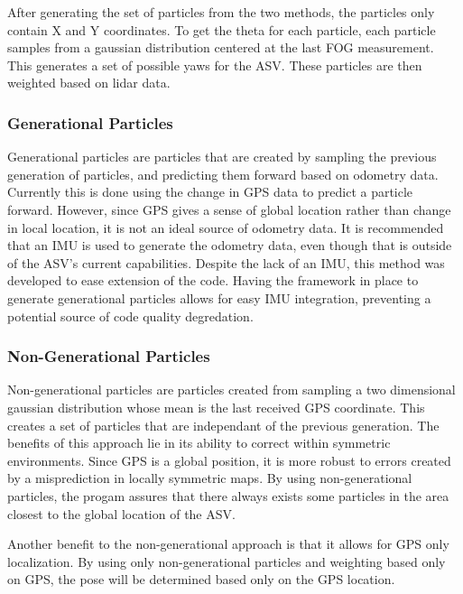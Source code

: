 \documentclass[10pt]{IEEEtran}
\begin{document}
After generating the set of particles from the two methods, the particles only contain X and
Y coordinates.  To get the theta for each particle, each particle samples from a gaussian
distribution centered at the last FOG measurement.  This generates a set of possible yaws
for the ASV.  These particles are then weighted based on lidar data.

\subsubsection{Generational Particles}
Generational particles are particles that are created by sampling the previous generation of
particles, and predicting them forward based on odometry data. Currently this is done using
the change in GPS data to predict a particle forward.  However, since GPS gives a sense of 
global location rather than change in local location, it is not an ideal source of odometry
data.  It is recommended that an IMU is used to generate the odometry data, even though that
is outside of the ASV's current capabilities.  Despite the lack of an IMU, this method was
developed to ease extension of the code.  Having the framework in place to generate 
generational particles allows for easy IMU integration, preventing a potential source of 
code quality degredation.

\subsubsection{Non-Generational Particles}
Non-generational particles are particles created from sampling a two dimensional gaussian
distribution whose mean is the last received GPS coordinate.  This creates a set of particles
that are independant of the previous generation.  The benefits of this approach lie in its 
ability to correct within symmetric environments.  Since GPS is a global position, it is 
more robust to errors created by a misprediction in locally symmetric maps.  
By using non-generational particles, the progam assures that there always exists some 
particles in the area closest to the global location of the ASV. %

Another benefit to the non-generational approach is that it allows for GPS only localization.
By using only non-generational particles and weighting based only on GPS, the pose will 
be determined based only on the GPS location.
\end{document}
